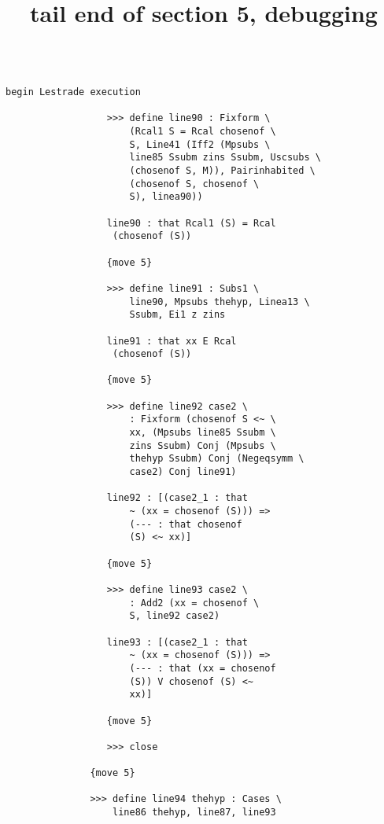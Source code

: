\documentclass{article}
\title{tail end of section 5, debugging}
\begin{document}
\maketitle

\begin{verbatim}

begin Lestrade execution

                  >>> define line90 : Fixform \
                      (Rcal1 S = Rcal chosenof \
                      S, Line41 (Iff2 (Mpsubs \
                      line85 Ssubm zins Ssubm, Uscsubs \
                      (chosenof S, M)), Pairinhabited \
                      (chosenof S, chosenof \
                      S), linea90))

                  line90 : that Rcal1 (S) = Rcal 
                   (chosenof (S))

                  {move 5}

                  >>> define line91 : Subs1 \
                      line90, Mpsubs thehyp, Linea13 \
                      Ssubm, Ei1 z zins

                  line91 : that xx E Rcal 
                   (chosenof (S))

                  {move 5}

                  >>> define line92 case2 \
                      : Fixform (chosenof S <~ \
                      xx, (Mpsubs line85 Ssubm \
                      zins Ssubm) Conj (Mpsubs \
                      thehyp Ssubm) Conj (Negeqsymm \
                      case2) Conj line91)

                  line92 : [(case2_1 : that 
                      ~ (xx = chosenof (S))) => 
                      (--- : that chosenof 
                      (S) <~ xx)]

                  {move 5}

                  >>> define line93 case2 \
                      : Add2 (xx = chosenof \
                      S, line92 case2)

                  line93 : [(case2_1 : that 
                      ~ (xx = chosenof (S))) => 
                      (--- : that (xx = chosenof 
                      (S)) V chosenof (S) <~ 
                      xx)]

                  {move 5}

                  >>> close

               {move 5}

               >>> define line94 thehyp : Cases \
                   line86 thehyp, line87, line93


\end{verbatim}
\end{document}
